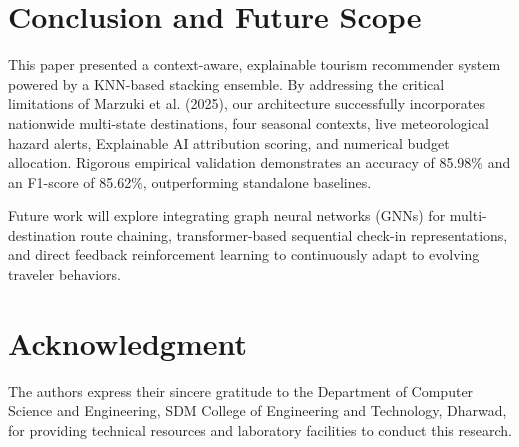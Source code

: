 \documentclass[conference]{IEEEtran}
\begin{document}
\section{Conclusion and Future Scope}
This paper presented a context-aware, explainable tourism recommender system powered by a KNN-based stacking ensemble. By addressing the critical limitations of Marzuki et al. (2025), our architecture successfully incorporates nationwide multi-state destinations, four seasonal contexts, live meteorological hazard alerts, Explainable AI attribution scoring, and numerical budget allocation. Rigorous empirical validation demonstrates an accuracy of 85.98\% and an F1-score of 85.62\%, outperforming standalone baselines.

Future work will explore integrating graph neural networks (GNNs) for multi-destination route chaining, transformer-based sequential check-in representations, and direct feedback reinforcement learning to continuously adapt to evolving traveler behaviors.

\section*{Acknowledgment}
The authors express their sincere gratitude to the Department of Computer Science and Engineering, SDM College of Engineering and Technology, Dharwad, for providing technical resources and laboratory facilities to conduct this research.



\end{document}
